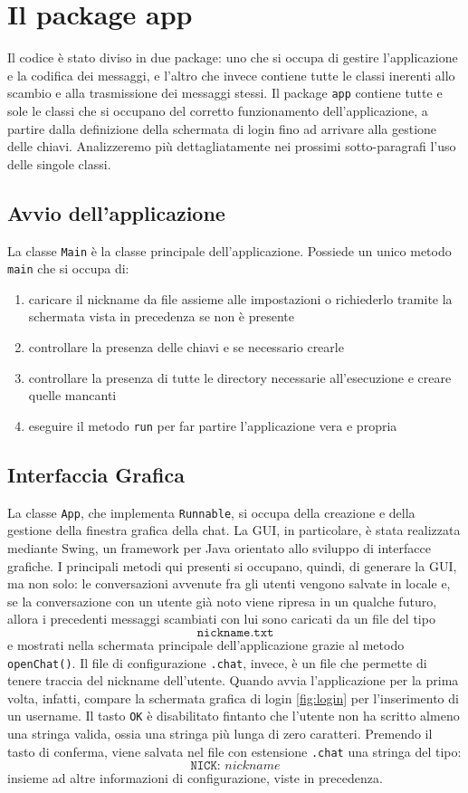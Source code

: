 \section{Il package app}
Il codice è stato diviso in due package: uno che si occupa di gestire l'applicazione
e la codifica dei messaggi, e l'altro che invece contiene tutte le classi inerenti
allo scambio e alla trasmissione dei messaggi stessi.
Il package \texttt{app} contiene tutte e sole le classi che si occupano del corretto
funzionamento dell'applicazione, a partire dalla definizione della schermata di login
fino ad arrivare alla gestione delle chiavi. Analizzeremo più dettagliatamente
nei prossimi sotto-paragrafi l'uso delle singole classi.

\subsection{Avvio dell'applicazione}
La classe \texttt{Main} è la classe principale dell'applicazione.
Possiede un unico metodo \texttt{main} che
si occupa di:
\begin{enumerate}
	\item caricare il nickname da file assieme alle impostazioni o richiederlo tramite la
	schermata vista in precedenza se non è presente
	\item controllare la presenza delle chiavi e se necessario crearle
	\item controllare la presenza di tutte le directory necessarie all'esecuzione e creare 
	quelle mancanti
	\item eseguire il metodo \texttt{run} per far partire l'applicazione vera e propria
\end{enumerate}

\subsection{Interfaccia Grafica}
La classe \texttt{App}, che implementa \texttt{Runnable}, si occupa della
creazione e della gestione della finestra grafica della chat. La GUI,
in particolare, è stata realizzata mediante Swing, un framework per Java
orientato allo sviluppo di interfacce grafiche.
I principali metodi qui presenti si occupano, quindi, di generare la GUI, ma non
solo: le conversazioni avvenute fra gli utenti vengono salvate in locale e, se
la conversazione con un utente già noto viene ripresa in un qualche futuro, allora
i precedenti messaggi scambiati con lui sono caricati da un file del tipo
$$ \texttt{nickname.txt} $$ 
e mostrati nella schermata principale dell'applicazione grazie al metodo \texttt{openChat()}.
Il file di configurazione \texttt{.chat}, invece, è un file che permette di
tenere traccia del nickname dell'utente. Quando avvia l'applicazione per la
prima volta, infatti, compare la schermata grafica di login \ref{fig:login} per l'inserimento
di un username. Il tasto \texttt{OK} è disabilitato fintanto che l'utente non ha
scritto almeno una stringa valida, ossia una stringa più lunga di zero caratteri.
Premendo il tasto di conferma, viene salvata nel file con estensione \texttt{.chat}
una stringa del tipo:
$$ \texttt{NICK: $nickname$} $$
insieme ad altre informazioni di configurazione, viste in precedenza.

